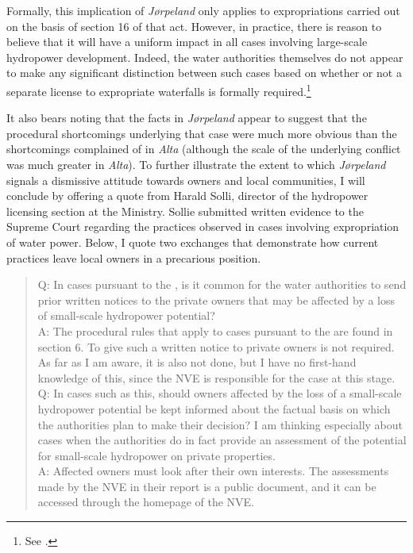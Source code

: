 Formally, this implication of {\it Jørpeland} only applies to expropriations carried out on the basis of section 16 of that act. However, in practice, there is reason to believe that it will have a uniform impact in all cases involving large-scale hydropower development. Indeed, the water authorities themselves do not appear to make any significant distinction between such cases based on whether or not a separate license to expropriate waterfalls is formally required.\footnote{See \cite{flatby08}.}

It also bears noting that the facts in {\it Jørpeland} appear to suggest that the procedural shortcomings underlying that case were much more obvious than the shortcomings complained of in {\it Alta} (although the scale of the underlying conflict was much greater in {\it Alta}). To further illustrate the extent to which {\it Jørpeland} signals a dismissive attitude towards owners and local communities, I will conclude by offering a quote from Harald Solli, director of the hydropower licensing section at the Ministry. Sollie submitted written evidence to the Supreme Court regarding the practices observed in cases involving expropriation of water power. Below, I quote two exchanges that demonstrate how current practices leave local owners in a precarious position.

\begin{quote}
Q: In cases pursuant to the \cite{wra17}, is it common for the water authorities to send prior written notices to the private owners that may be affected by a loss of small-scale hydropower potential? \\
A: The procedural rules that apply to cases pursuant to the \cite{wra17} are found in section 6. To give such a written notice to private owners is not required. As far as I am aware, it is also not done, but I have no first-hand knowledge of this, since the NVE is responsible for the case at this stage. \\
Q: In cases such as this, should owners affected by the loss of a small-scale hydropower potential be kept informed about the factual basis on which the authorities plan to make their decision? I am thinking especially about cases when the authorities do in fact provide an assessment of the potential for small-scale hydropower on private properties. \\
A: Affected owners must look after their own interests. The assessments made by the NVE in their report is a public document, and it can be accessed through the homepage of the NVE.
\end{quote}

